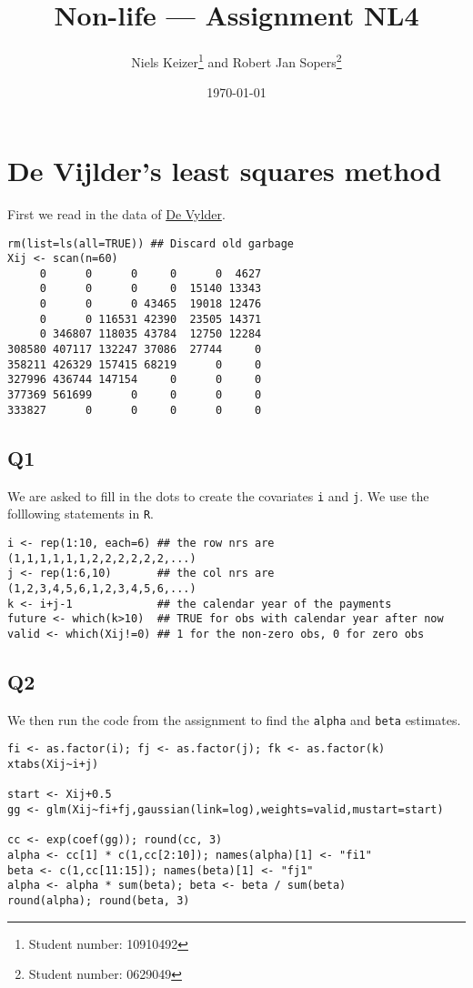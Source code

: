 \documentclass[11pt]{article}
\title{Non-life --- Assignment NL4}  %
\author{
  Niels Keizer\footnote{Student number: 10910492}
  \quad and \quad
  Robert Jan Sopers\footnote{Student number: 0629049}
}
\date{\today}
\begin{document}
\maketitle

\section{De Vijlder's least squares method}


First we read in the data of \href{http://www1.fee.uva.nl/ke/act/people/kaas/DeVylder78.pdf}{De Vylder}.

\begin{verbatim}
rm(list=ls(all=TRUE)) ## Discard old garbage
Xij <- scan(n=60)
     0      0      0     0      0  4627
     0      0      0     0  15140 13343
     0      0      0 43465  19018 12476
     0      0 116531 42390  23505 14371
     0 346807 118035 43784  12750 12284
308580 407117 132247 37086  27744     0
358211 426329 157415 68219      0     0
327996 436744 147154     0      0     0
377369 561699      0     0      0     0
333827      0      0     0      0     0
\end{verbatim}

\subsection*{Q1}

We are asked to fill in the dots to create the covariates \verb|i| and \verb|j|. We use the folllowing statements in \verb|R|.

\begin{verbatim}
i <- rep(1:10, each=6) ## the row nrs are (1,1,1,1,1,1,2,2,2,2,2,2,...)
j <- rep(1:6,10)       ## the col nrs are (1,2,3,4,5,6,1,2,3,4,5,6,...)
k <- i+j-1             ## the calendar year of the payments
future <- which(k>10)  ## TRUE for obs with calendar year after now
valid <- which(Xij!=0) ## 1 for the non-zero obs, 0 for zero obs
\end{verbatim}

\subsection*{Q2}

We then run the code from the assignment to find the \verb|alpha| and \verb|beta| estimates.

\begin{verbatim}
fi <- as.factor(i); fj <- as.factor(j); fk <- as.factor(k)
xtabs(Xij~i+j)

start <- Xij+0.5
gg <- glm(Xij~fi+fj,gaussian(link=log),weights=valid,mustart=start)

cc <- exp(coef(gg)); round(cc, 3)
alpha <- cc[1] * c(1,cc[2:10]); names(alpha)[1] <- "fi1"
beta <- c(1,cc[11:15]); names(beta)[1] <- "fj1"
alpha <- alpha * sum(beta); beta <- beta / sum(beta)
round(alpha); round(beta, 3)
\end{verbatim}
\end{document}
